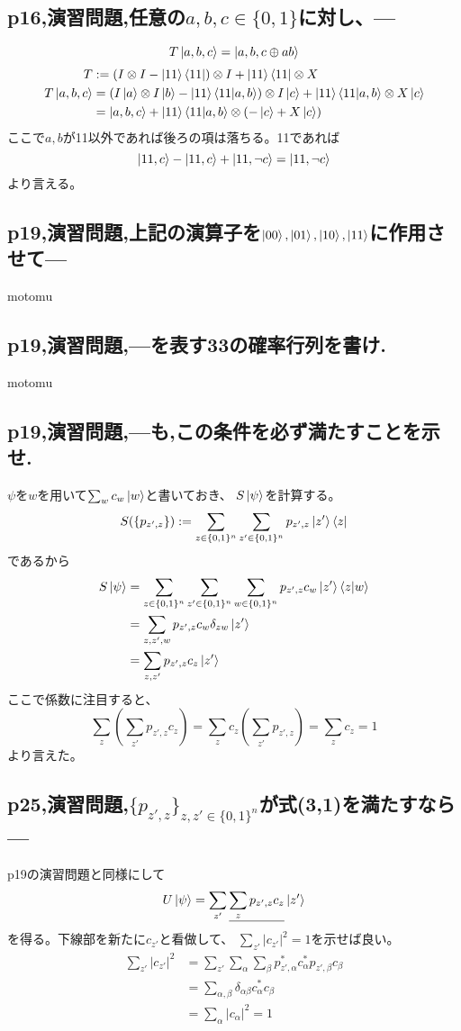 \documentclass[b5paper,fleqn]{ltjsarticle}
\newcommand\s[1]{\subsection*{#1}\noindent\ignorespaces}
\newcommand\al[1]{\begin{align*}#1\end{align*}}
\begin{document}
\s{p16,演習問題,任意の$a,b,c\in\{0,1\}$に対し、---}
\[T\ket{a,b,c}=\ket{a,b,c\oplus ab}\]
\al{T&:=(I\otimes I-\ket{11}\bra{11})\otimes I+\ket{11}\bra{11}\otimes X\\
T\ket{a,b,c}&=(I\ket{a}\otimes I\ket{b}-\ket{11}\braket{11|a,b})
\otimes I\ket{c}+\ket{11}\braket{11|a,b}\otimes X\ket{c}\\
&=\ket{a,b,c}+\ket{11}\braket{11|a,b}\otimes(-\ket{c}+X\ket{c})
}
ここで$a,b$が11以外であれば後ろの項は落ちる。11であれば
\[\ket{11,c}-\ket{11,c}+\ket{11,\lnot c}=\ket{11,\lnot c}\]
より言える。
\s{p19,演習問題,上記の演算子を$\ket{00},\ket{01},\ket{10},\ket{11}$に作用させて---}
motomu
\s{p19,演習問題,---を表す3\times 3の確率行列を書け.}
motomu
\s{p19,演習問題,---も,この条件を必ず満たすことを示せ.}
$\psi$を$w$を用いて$\sum_wc_w\ket{w}$と書いておき、
$S\ket{\psi}$を計算する。
\[S(\{p_{z',z}\}):=\sum_{z\in\{0,1\}^n}\sum_{z'\in\{0,1\}^n}p_{z',z}
\ket{z'}\bra{z}\]
であるから
\al{S\ket{\psi}&=\sum_{z\in\{0,1\}^n}\sum_{z'\in\{0,1\}^n}
\sum_{w\in\{0,1\}^n}p_{z',z}c_w\ket{z'}\braket{z|w}\\
&=\sum_{z,z',w}p_{z',z}c_w\delta_{zw}\ket{z'}\\
&=\sum_{z,z'}p_{z',z}c_z\ket{z'}
}
ここで係数に注目すると、
\[\sum_z\left(\sum_{z'}p_{z',z}c_z\right)
=\sum_zc_z\left(\sum_{z'}p_{z',z}\right)
=\sum_zc_z=1\]
より言えた。
\s{p25,演習問題,$\{p_{z',z}\}_{z,z'\in\{0,1\}^n}$が式(3,1)を満たすなら---}
p19の演習問題と同様にして
\[U\ket{\psi}=\sum_{z'}
\underline{\sum_zp_{z',z}c_{z}}\ket{z'}\]
を得る。下線部を新たに$c_{z'}$と看做して、
$\sum_{z'}|c_{z'}|^2=1$を示せば良い。
\al{
  \sum_{z'}|c_{z'}|^2&=\sum_{z'}\sum_\alpha\sum_\beta
  p_{z',\alpha}^*c_\alpha^*p_{z',\beta}c_\beta\\
  &=\sum_{\alpha,\beta}\delta_{\alpha\beta}c^*_\alpha c_\beta\\
  &=\sum_\alpha|c_\alpha|^2=1
}
\end{document}
